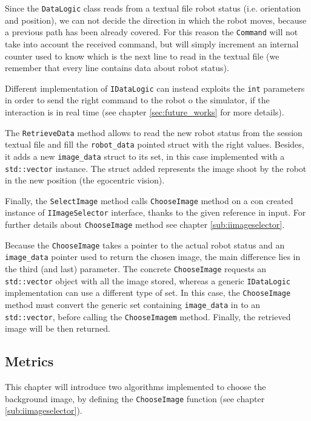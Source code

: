 Since the \texttt{DataLogic} class reads from a textual file robot status (i.e. orientation
and position), we can not decide the direction in which the robot moves, because a previous
path has been already covered. For this reason the \texttt{Command} will not take into account
the received command, but will simply increment an internal counter used to know which is the next
line to read in the textual file (we remember that every line contains data about robot status).
%

%
Different implementation of \texttt{IDataLogic} can instead exploits the \texttt{int} parameters
in order to send the right command to the robot o the simulator, if the interaction is in real time
(see chapter \ref{sec:future_works} for more details).
%

%
The \texttt{RetrieveData} method allows to read the new robot status from the session textual file
and fill the \texttt{robot\_data} pointed struct with the right values. Besides, it adds a new
\texttt{image\_data} struct to its set, in this case implemented with a \texttt{std::vector} instance.
The struct added represents the image shoot by the robot in the new position (the egocentric
vision).
%

%
Finally, the \texttt{SelectImage} method calls \texttt{ChooseImage} method on a con created instance
of \texttt{IImageSelector} interface, thanks to the given reference in input. For further details
about \texttt{ChooseImage} method see chapter \ref{sub:iimageselector}.
%

%
Because the \texttt{ChooseImage} takes a pointer to the actual robot status and an
\texttt{image\_data} pointer used to return the chosen image, the main difference lies in the third (and last)
parameter. The concrete \texttt{ChooseImage} requests an \texttt{std::vector} object with all the image stored,
whereas a generic \texttt{IDataLogic} implementation can use a different type of set. In this case, the
\texttt{ChooseImage} method must convert the generic set containing \texttt{image\_data} in to an \texttt{std::vector},
before calling the \texttt{ChooseImagem} method. Finally, the retrieved image will be then returned.
%



\subsection{Metrics}
\label{sub:metrics}

This chapter will introduce two algorithms implemented to choose the
background image, by defining the \texttt{ChooseImage} function (see
chapter \ref{sub:iimageselector}).

